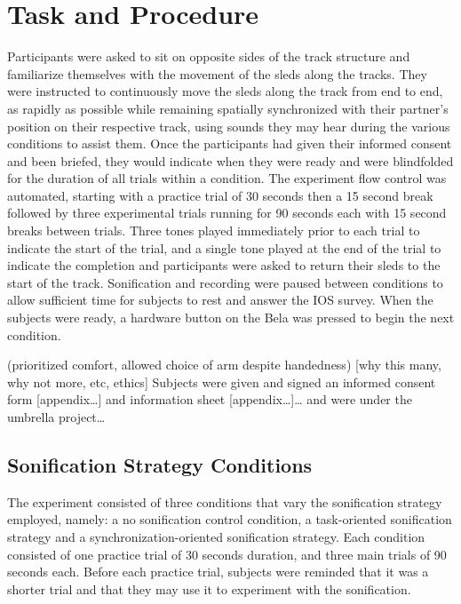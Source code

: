 \documentclass[10pt,a4paper,onecolumn]{article}
\begin{document}
\hypertarget{task-and-procedure}{%
\section{Task and Procedure}\label{task-and-procedure}}

Participants were asked to sit on opposite sides of the track structure and familiarize themselves with the movement of the sleds along the tracks. They were instructed to continuously move the sleds along the track from end to end, as rapidly as possible while remaining spatially synchronized with their partner's position on their respective track, using sounds they may hear during the various conditions to assist them. Once the participants had given their informed consent and been briefed, they would indicate when they were ready and were blindfolded for the duration of all trials within a condition. The experiment flow control was automated, starting with a practice trial of 30 seconds then a 15 second break followed by three experimental trials running for 90 seconds each with 15 second breaks between trials. Three tones played immediately prior to each trial to indicate the start of the trial, and a single tone played at the end of the trial to indicate the completion and participants were asked to return their sleds to the start of the track. Sonification and recording were paused between conditions to allow sufficient time for subjects to rest and answer the IOS survey. When the subjects were ready, a hardware button on the Bela was pressed to begin the next condition.

(prioritized comfort, allowed choice of arm despite handedness) {[}why this many, why not more, etc, ethics{]} Subjects were given and signed an informed consent form {[}appendix\ldots{]} and information sheet {[}appendix\ldots{]}\ldots{} and were under the umbrella project\ldots{}

\hypertarget{sonification-strategy-conditions}{%
\subsection{Sonification Strategy Conditions}\label{sonification-strategy-conditions}}

The experiment consisted of three conditions that vary the sonification strategy employed, namely: a no sonification control condition, a task-oriented sonification strategy and a synchronization-oriented sonification strategy. Each condition consisted of one practice trial of 30 seconds duration, and three main trials of 90 seconds each. Before each practice trial, subjects were reminded that it was a shorter trial and that they may use it to experiment with the sonification.
\end{document}
